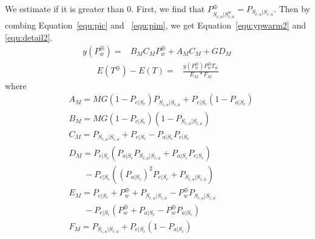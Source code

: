 We estimate if it is greater than $0$.
First, we find that $P_{S_{\bar{c}, a}|S_{\bar{c},\bar{a}}^{\bar{w}}}^{\oplus} = P_{S_{\bar{c}, a}|S_{\bar{c},\bar{a}}}$.
Then by combing Equation~\ref{equ:pic} and ~\ref{equ:pim}, we get Equation~\ref{equ:ypwarm2} and \ref{equ:detail2}.
\begin{equation}
\label{equ:ypwarm2}
\begin{split}
y(P_{w}^{\oplus}) = &B_{M}C_{M}P_{w}^{\oplus}+A_{M}C_{M}+GD_{M} \,
\end{split}\end{equation}
\begin{equation}
\label{equ:detail2}
\begin{split}
E(T^{\oplus}) - E(T) = &\frac{y(P_{w}^{\oplus})P_{w}^{\oplus}T_{w}}{E_{M}*F_{M}}
\end{split}\end{equation}
where
\begin{equation*}
\begin{split}
&A_{M}= MG(1-P_{e|S_{c}})P_{S_{\bar{c}, a}|S_{\bar{c},\bar{a}}}+P_{e|S_{c}}(1-P_{a|S_{c}})\\
&B_{M}=MG(1-P_{e|S_{c}})(1-P_{S_{\bar{c}, a}|S_{\bar{c},\bar{a}}})\\
&C_{M}=P_{S_{\bar{c}, a}|S_{\bar{c},\bar{a}}}+P_{e|S_{c}}-P_{a|S_{c}}P_{e|S_{c}}\\
&D_{M}=P_{e|S_{c}}(P_{a|S_{c}}P_{S_{\bar{c}, a}|S_{\bar{c},\bar{a}}}+P_{a|S_{c}}P_{e|S_{c}}) \\
& \ \ \ \ \ \ \ \ -P_{e|S_{c}}((P_{a|S_{c}})^2P_{e|S_{c}}+P_{S_{\bar{c}, a}|S_{\bar{c},\bar{a}}})\\
&E_{M}=P_{e|S_{c}}+P_{w}^{\oplus}+P_{S_{\bar{c}, a}|S_{\bar{c},\bar{a}}}-P_{w}^{\oplus}P_{S_{\bar{c}, a}|S_{\bar{c},\bar{a}}} \\& \ \ \ \ \ \ \ \ -P_{e|S_{c}}(P_{w}^{\oplus}+P_{a|S_{c}}-P_{w}^{\oplus}P_{a|S_{c}})\\
&F_{M}=P_{S_{\bar{c}, a}|S_{\bar{c},\bar{a}}}+P_{e|S_{c}}(1-P_{a|S_{c}})
\end{split}\end{equation*}

